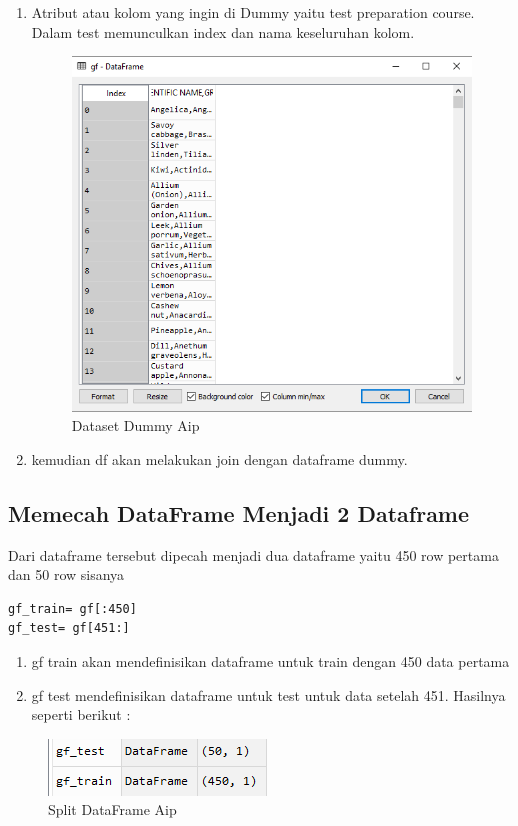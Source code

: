 \begin{enumerate}
\item Atribut atau kolom yang ingin di Dummy yaitu test preparation course. Dalam test memunculkan index dan nama keseluruhan kolom.
\begin{figure}[ht]
\centering
\includegraphics[scale=0.5]{figures/AIP/c3.PNG}
\caption{Dataset Dummy Aip}
\label{Aplikasi Pandas}
\end{figure}
\item kemudian df akan melakukan join dengan dataframe dummy.
\end{enumerate}

\subsection{Memecah DataFrame Menjadi 2 Dataframe}
Dari dataframe tersebut dipecah menjadi dua dataframe yaitu 450 row pertama dan 50 row sisanya
\begin{verbatim}
gf_train= gf[:450]
gf_test= gf[451:]
\end{verbatim}
\begin{enumerate}
\item gf train akan mendefinisikan dataframe untuk train dengan 450 data pertama
\item gf test mendefinisikan dataframe untuk test untuk data setelah 451. Hasilnya seperti berikut :
\end{enumerate}
\begin{figure}[ht]
\centering
\includegraphics[scale=0.5]{figures/AIP/c4.PNG}
\caption{Split DataFrame Aip}
\label{Aplikasi Pandas}
\end{figure}

